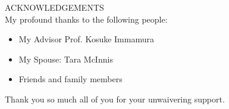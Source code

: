 ACKNOWLEDGEMENTS\\

My profound thanks to the following people:
\begin{itemize}
    \item My Advisor Prof. Kosuke Immamura
    \item My Spouse: Tara McInnis
    \item Friends and family members
\end{itemize}

Thank you so much all of you for your unwaivering support.

\newpage
